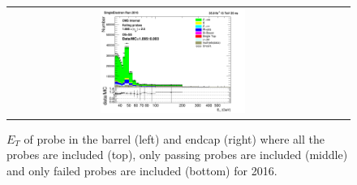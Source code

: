 \begin{figure}[htp]
\begin{center}
\begin{tabular}{cc}
      \includegraphics[width=0.45\textwidth]{figures/Zprime/2016/ScaleFactor/SameSign/nominal/stack_Et_Endcap_fail_PUW.png}
    \end{tabular}
    \caption{$E_{T}$ of probe in the barrel (left) and endcap (right) where all the probes are included (top), only passing probes are included (middle) and only failed probes are included (bottom) for 2016.}
    \label{fig:SS_nominal_Et_2016}
  \end{center}
\end{figure}
